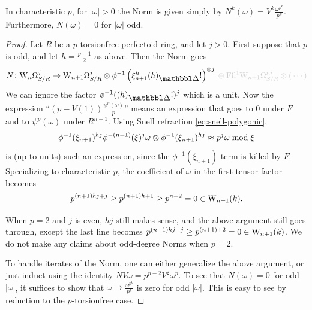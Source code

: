 \begin{corollary}
  \label{cor:norms-Fp}
  In characteristic $p$, for $|\omega|>0$ the Norm is given simply by $N^k(\omega)=V^k\frac{\omega^{p^k}}{p^k}$. Furthermore, $N(\omega)=0$ for $|\omega|$ odd.
\end{corollary}
\begin{proof}
  Let $R$ be a $p$-torsionfree perfectoid ring, and let $j>0$. First suppose that $p$ is odd, and let $h=\frac{p-1}2$ as above. Then the Norm goes
  \[
    N\colon \dRW[n]^j_{S/R} \to
    \dRW[n+1]^j_{S/R} \tnsr \phi^{-1}\left(\xi_{n+1}^h (h)_\prism!\right)^{\tnsr j}
    \fade{{}\oplus
    \Fil^1\dRW[n+1]^{pj}_{S/R} \tnsr ({}\cdots)}
  \]
  We can ignore the factor $\phi^{-1}((h)_\prism!)^j$ which is a unit. Now the expression ``$(p-V(1))\frac{\psi^p(\omega)}p$'' means an expression that goes to $0$ under $F$ and to $\psi^p(\omega)$ under $R^{n+1}$. Using Snell refraction \eqref{eq:snell-polygonic},
  \[
    \phi^{-1}(\xi_{n+1})^{hj} \phi^{-(n+1)}(\xi)^j \omega \otimes \phi^{-1}(\xi_{n+1})^{hj} \approx p^j \omega \bmod \xi
  \]
  is (up to units) such an expression, since the $\phi^{-1}(\xi_{n+1})$ term is killed by $F$. Specializing to characteristic $p$, the coefficient of $\omega$ in the first tensor factor becomes
  \[ p^{(n+1)hj+j} \ge p^{(n+1)h+1} \ge p^{n+2} = 0 \in \mathrm W_{n+1}(k). \]

  When $p=2$ and $j$ is even, $hj$ still makes sense, and the above argument still goes through, except the last line becomes $p^{(n+1)hj+j} \ge p^{(n+1)+2} = 0 \in \mathrm W_{n+1}(k)$. We do not make any claims about odd-degree Norms when $p=2$. 

  To handle iterates of the Norm, one can either generalize the above argument, or just induct using the identity $NV\omega = p^{p-2} V^2 \omega^p$. To see that $N(\omega)=0$ for odd $|\omega|$, it suffices to show that $\omega \mapsto \frac{\omega^{p^k}}{p^k}$ is zero for odd $|\omega|$. This is easy to see by reduction to the $p$-torsionfree case.
\end{proof}

